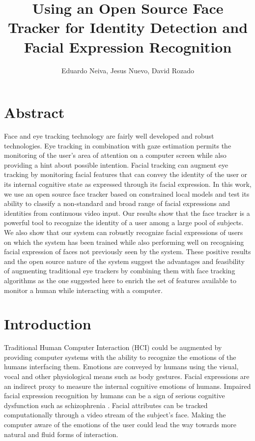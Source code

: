 \documentclass[]{article}
\title{Using an Open Source Face Tracker for Identity Detection and Facial Expression Recognition}
\author{Eduardo Neiva, Jesus Nuevo, David Rozado}
\begin{document}
\maketitle

\section{Abstract}

Face and eye tracking technology are fairly well developed and robust technologies. Eye tracking in combination with
gaze estimation permits the monitoring of the user's area of attention on a computer screen while also providing a hint
about possible intention. Facial tracking can augment eye tracking by monitoring facial features that can convey the
identity of the user or its internal cognitive state as expressed through its facial expression. In this work, we use an
open source face tracker based on constrained local models and test its ability to classify a non-standard and broad
range of facial expressions and identities from continuous video input. Our results show that the face tracker is a
powerful tool to recognize the identity of a user among a large pool of subjects. We also show that our system can
robustly recognize facial expressions of users on which the system has been trained while also performing well on
recognising facial expression of faces not previously seen by the system. These positive results and the open source
nature of the system suggest the advantages and feasibility of augmenting traditional eye trackers by combining them
with face tracking algorithms as the one suggested here to enrich the set of features available to monitor a human while
interacting with a computer.


\section{Introduction}
Traditional Human Computer Interaction (HCI) could be augmented by providing computer systems with the ability to
recognize the emotions of the humans interfacing them. Emotions are conveyed by humans using the visual, vocal
and other physiological means such as body gestures. Facial expressions are an indirect proxy to measure the internal
cognitive emotions of humans. Impaired facial expression recognition by humans can be a sign of serious cognitive
dysfunction such as schizophrenia \cite{Edwards2002789}.  Facial attributes can be tracked computationally through a
video stream of the subject's face. Making the computer aware of the emotions of the user could lead the way towards
more natural and fluid forms of interaction.
\end{document}
